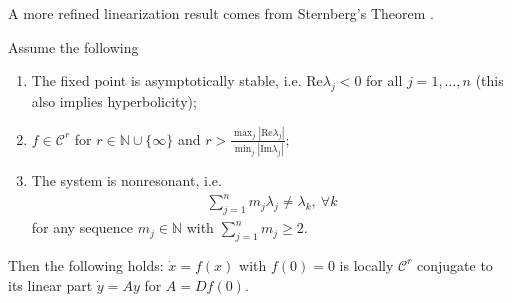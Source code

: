 A more refined linearization result comes from Sternberg's Theorem \cite{Chicone}.
\begin{theorem}[Sternberg]
Assume the following
\begin{enumerate}
	\item The fixed point is asymptotically stable, i.e. $ \textrm{Re} \lambda _j<0$ for all $j=1,\ldots,n$ (this also implies hyperbolicity);
	\item $f\in \mathcal{C}^{r}$ for $r\in \mathbb{N}\cup \{\infty \}$ and $r>\frac{\max_{j}| \textrm{Re} \lambda _j|}{\min_{j}| \textrm{Im} \lambda _j|}$;
	\item The system is nonresonant, i.e. 
		\begin{align}
			\sum_{j=1}^{n}m_j \lambda _j \neq \lambda_k,\ \forall k
		\end{align}
	for any sequence $m_j \in \mathbb{N}$ with $\sum_{j=1}^{n} m_j \geq 2$.
	
\end{enumerate}
Then the following holds: $\dot{x}=f(x)$ with $f(0)=0$ is locally $\mathcal{C}^{r}$ conjugate to its linear part $\dot{y}=Ay$ for $A= Df(0)$.
\end{theorem}



